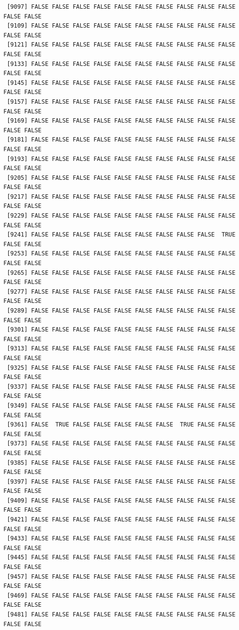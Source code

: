 \documentclass[
  a4paper,
  DIV=11,
  numbers=noendperiod]{scrartcl}
\begin{document}
\begin{verbatim}
 [9097] FALSE FALSE FALSE FALSE FALSE FALSE FALSE FALSE FALSE FALSE FALSE FALSE
 [9109] FALSE FALSE FALSE FALSE FALSE FALSE FALSE FALSE FALSE FALSE FALSE FALSE
 [9121] FALSE FALSE FALSE FALSE FALSE FALSE FALSE FALSE FALSE FALSE FALSE FALSE
 [9133] FALSE FALSE FALSE FALSE FALSE FALSE FALSE FALSE FALSE FALSE FALSE FALSE
 [9145] FALSE FALSE FALSE FALSE FALSE FALSE FALSE FALSE FALSE FALSE FALSE FALSE
 [9157] FALSE FALSE FALSE FALSE FALSE FALSE FALSE FALSE FALSE FALSE FALSE FALSE
 [9169] FALSE FALSE FALSE FALSE FALSE FALSE FALSE FALSE FALSE FALSE FALSE FALSE
 [9181] FALSE FALSE FALSE FALSE FALSE FALSE FALSE FALSE FALSE FALSE FALSE FALSE
 [9193] FALSE FALSE FALSE FALSE FALSE FALSE FALSE FALSE FALSE FALSE FALSE FALSE
 [9205] FALSE FALSE FALSE FALSE FALSE FALSE FALSE FALSE FALSE FALSE FALSE FALSE
 [9217] FALSE FALSE FALSE FALSE FALSE FALSE FALSE FALSE FALSE FALSE FALSE FALSE
 [9229] FALSE FALSE FALSE FALSE FALSE FALSE FALSE FALSE FALSE FALSE FALSE FALSE
 [9241] FALSE FALSE FALSE FALSE FALSE FALSE FALSE FALSE FALSE  TRUE FALSE FALSE
 [9253] FALSE FALSE FALSE FALSE FALSE FALSE FALSE FALSE FALSE FALSE FALSE FALSE
 [9265] FALSE FALSE FALSE FALSE FALSE FALSE FALSE FALSE FALSE FALSE FALSE FALSE
 [9277] FALSE FALSE FALSE FALSE FALSE FALSE FALSE FALSE FALSE FALSE FALSE FALSE
 [9289] FALSE FALSE FALSE FALSE FALSE FALSE FALSE FALSE FALSE FALSE FALSE FALSE
 [9301] FALSE FALSE FALSE FALSE FALSE FALSE FALSE FALSE FALSE FALSE FALSE FALSE
 [9313] FALSE FALSE FALSE FALSE FALSE FALSE FALSE FALSE FALSE FALSE FALSE FALSE
 [9325] FALSE FALSE FALSE FALSE FALSE FALSE FALSE FALSE FALSE FALSE FALSE FALSE
 [9337] FALSE FALSE FALSE FALSE FALSE FALSE FALSE FALSE FALSE FALSE FALSE FALSE
 [9349] FALSE FALSE FALSE FALSE FALSE FALSE FALSE FALSE FALSE FALSE FALSE FALSE
 [9361] FALSE  TRUE FALSE FALSE FALSE FALSE FALSE  TRUE FALSE FALSE FALSE FALSE
 [9373] FALSE FALSE FALSE FALSE FALSE FALSE FALSE FALSE FALSE FALSE FALSE FALSE
 [9385] FALSE FALSE FALSE FALSE FALSE FALSE FALSE FALSE FALSE FALSE FALSE FALSE
 [9397] FALSE FALSE FALSE FALSE FALSE FALSE FALSE FALSE FALSE FALSE FALSE FALSE
 [9409] FALSE FALSE FALSE FALSE FALSE FALSE FALSE FALSE FALSE FALSE FALSE FALSE
 [9421] FALSE FALSE FALSE FALSE FALSE FALSE FALSE FALSE FALSE FALSE FALSE FALSE
 [9433] FALSE FALSE FALSE FALSE FALSE FALSE FALSE FALSE FALSE FALSE FALSE FALSE
 [9445] FALSE FALSE FALSE FALSE FALSE FALSE FALSE FALSE FALSE FALSE FALSE FALSE
 [9457] FALSE FALSE FALSE FALSE FALSE FALSE FALSE FALSE FALSE FALSE FALSE FALSE
 [9469] FALSE FALSE FALSE FALSE FALSE FALSE FALSE FALSE FALSE FALSE FALSE FALSE
 [9481] FALSE FALSE FALSE FALSE FALSE FALSE FALSE FALSE FALSE FALSE FALSE FALSE

\end{verbatim}
\end{document}
